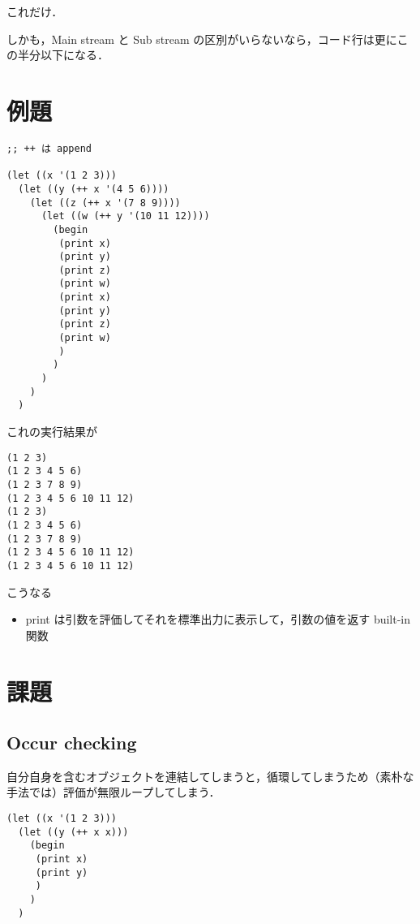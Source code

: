 \documentclass[10pt, a4j, twocolumn]{scrartcl}
\begin{document}
これだけ．

しかも，Main stream と Sub stream の区別がいらないなら，コード行は更にこの半分以下になる．


\section{例題}
\label{sec:org9086482}

\begin{lstlisting}
;; ++ は append

(let ((x '(1 2 3)))
  (let ((y (++ x '(4 5 6))))
    (let ((z (++ x '(7 8 9))))
      (let ((w (++ y '(10 11 12))))
        (begin
         (print x)
         (print y)
         (print z)
         (print w)
         (print x)
         (print y)
         (print z)
         (print w)
         )
        )
      )
    )
  )
\end{lstlisting}


これの実行結果が

\begin{verbatim}
(1 2 3)
(1 2 3 4 5 6)
(1 2 3 7 8 9)
(1 2 3 4 5 6 10 11 12)
(1 2 3)
(1 2 3 4 5 6)
(1 2 3 7 8 9)
(1 2 3 4 5 6 10 11 12)
(1 2 3 4 5 6 10 11 12)
\end{verbatim}

こうなる
\begin{itemize}
\item print は引数を評価してそれを標準出力に表示して，引数の値を返す built-in 関数
\end{itemize}


\section{課題}
\label{sec:orgb0d91b7}

\subsection{Occur checking}
\label{sec:orged8cc1f}

自分自身を含むオブジェクトを連結してしまうと，循環してしまうため（素朴な手法では）評価が無限ループしてしまう．

\begin{lstlisting}
(let ((x '(1 2 3)))
  (let ((y (++ x x)))
    (begin
     (print x)
     (print y)
     )
    )
  )
\end{lstlisting}
\end{document}
